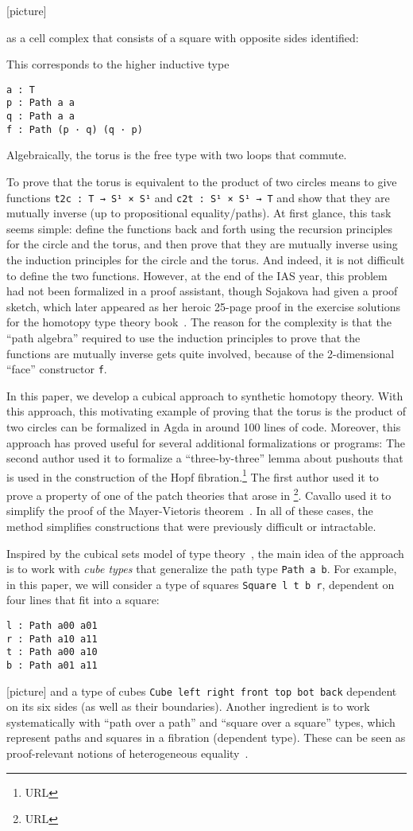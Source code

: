 [picture]

as a cell complex that consists of a square with opposite sides
identified:

This corresponds to the higher inductive type
\begin{verbatim}
a : T
p : Path a a
q : Path a a
f : Path (p · q) (q · p)
\end{verbatim}
Algebraically, the torus is the free type with two loops that commute.

To prove that the torus is equivalent to the product of two circles
means to give functions \verb|t2c : T → S¹ × S¹| and
\verb|c2t : S¹ × S¹ → T| and show that they are mutually inverse (up to
propositional equality/paths).  At first glance, this task seems simple:
define the functions back and forth using the recursion principles for
the circle and the torus, and then prove that they are mutually inverse
using the induction principles for the circle and the torus.  And
indeed, it is not difficult to define the two functions.  However, at
the end of the IAS year, this problem had not been formalized in a proof
assistant, though Sojakova had given a proof sketch, which later
appeared as her heroic 25-page proof in the exercise solutions for the
homotopy type theory book~\citep{uf13hott-book}.  The reason for the
complexity is that the ``path algebra'' required to use the induction
principles to prove that the functions are mutually inverse gets quite
involved, because of the 2-dimensional ``face'' constructor \verb|f|.

In this paper, we develop a cubical approach to synthetic homotopy
theory.  With this approach, this motivating example of proving that the
torus is the product of two circles can be formalized in Agda in around
100 lines of code.  Moreover, this approach has proved useful for
several additional formalizations or programs: The second author used it
to formalize a ``three-by-three'' lemma about pushouts that is used in
the construction of the Hopf fibration.\footnote{URL} The first author
used it to prove a property of one of the patch theories that arose in
\citep{amlh14patch}\footnote{URL}.  Cavallo used it to simplify the
proof of the Mayer-Vietoris theorem~\citep{cavallo}.  In all of these
cases, the method simplifies constructions that were previously
difficult or intractable. 

Inspired by the cubical sets model of type
theory~\citep{coquand+13cubical}, the main idea of the approach is to
work with \emph{cube types} that generalize the path type \verb|Path a b|.
For example, in this paper, we will consider a type of squares
\verb|Square l t b r|, dependent on four lines that fit into a square:
\begin{verbatim}
l : Path a00 a01
r : Path a10 a11
t : Path a00 a10
b : Path a01 a11
\end{verbatim}
[picture] and a type of cubes \verb|Cube left right front top bot back|
dependent on its six sides (as well as their boundaries).  Another
ingredient is to work systematically with ``path over a path'' and
``square over a square'' types, which represent paths and squares in a
fibration (dependent type).  These can be seen as proof-relevant notions
of heterogeneous equality~\citep{mcbride00thesis}.  

